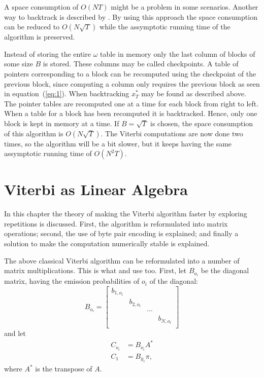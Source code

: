 A space consumption of $O(N T)$ might be a problem in some scenarios. Another
way to backtrack is described by \citet{Tarnas01061998}. By using this approach
the space consumption can be reduced to $O(N \sqrt{T})$ while the assymptotic
running time of the algorithm is preserved.

Instead of storing the entire $\omega$ table in memory only the last column of
blocks of some size $B$ is stored. These columns may be called checkpoints. A
table of pointers corresponding to a block can be recomputed using the
checkpoint of the previous block, since computing a column only requires the
previous block as seen in equation~(\ref{eq:1}). When backtracking $x_T^*$ may
be found as described above. The pointer tables are recomputed one at a time
for each block from right to left. When a table for a block has been recomputed
it is backtracked. Hence, only one block is kept in memory at a time. If
$B = \sqrt{T}$ is chosen, the space consumption of this algorithm is
$O(N \sqrt{T})$. The Viterbi computations are now done two times, so the
algorithm will be a bit slower, but it keeps having the same assymptotic
running time of $O(N^2 T)$.

\section{Viterbi as Linear Algebra}
\label{sec:algorithm-as-linear}

In this chapter the theory of making the Viterbi algorithm faster by exploring
repetitions is discussed. First, the algorithm is reformulated into matrix
operations; second, the use of byte pair encoding is explained; and finally
a solution to make the computation numerically stable is explained.

The above classical Viterbi algorithm can be reformulated into a number of
matrix multiplications. This is what \citet{sand2013ziphmmlib} and
\citet{lifshits2009speeding} use too. First, let $B_{o_i}$ be the diagonal
matrix, having the emission probabilities of $o_i$ of the diagonal:
\begin{equation*}
  B_{o_i} =
  \begin{bmatrix}
    b_{1, o_i} &            &        &            \\
               & b_{2, o_i} &        &            \\
               &            & \cdots &            \\
               &            &        & b_{N, o_i} \\
  \end{bmatrix}
\end{equation*}
and let
\begin{align*}
  C_{o_i} &= B_{o_i} A^* \\
  C_1 &= B_{y_1} \pi,
\end{align*}
where $A^*$ is the transpose of $A$.

